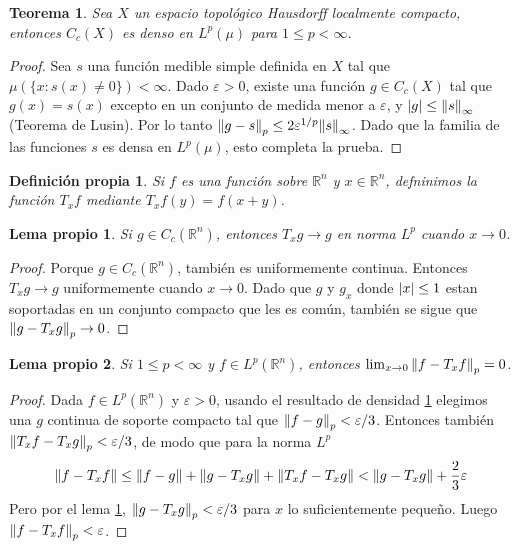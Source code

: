 \documentclass{article}
\newcommand{\realNumbers}{\mathbb{R}}
\newtheorem{theorem}{Teorema}
\newtheorem{myDefinition}{Definición propia}
\newtheorem{myLemma}{Lema propio}
\theoremstyle{remark}
\begin{document}
  \begin{theorem}
    \label{theorem:compactlySupportedFunctionsAreDenseInLp}
    Sea \(X\) un espacio topológico Hausdorff localmente compacto, entonces \(C_c(X)\) es denso en \(L^p(\mu)\) para \(1 \leq p < \infty\).
  \end{theorem}
  \begin{proof}
    Sea \(s\) una función medible simple definida en \(X\) tal que \(\mu(\{x : s(x) \neq 0\}) < \infty\).
    Dado \(\varepsilon > 0\), existe una función \(g \in C_c(X)\) tal que \(g(x) = s(x)\) excepto en un conjunto de medida menor a \(\varepsilon\), y \(\abs{g} \leq \norm{s}_{\infty}\) (Teorema de Lusin).
    Por lo tanto \(\norm{g - s}_p \leq 2 \varepsilon^{1 / p} \norm{s}_{\infty}\).
    Dado que la familia de las funciones \(s\) es densa en \(L^p(\mu)\), esto completa la prueba.
  \end{proof}

  \begin{myDefinition}
    Si \(f\) es una función sobre \(\realNumbers^n\) y \(x \in \realNumbers^n\), defninimos la función \(T_x f\) mediante \(T_x f (y) = f(x + y)\).
  \end{myDefinition}

  \begin{myLemma}
    \label{myLemma:LpContinuityOfTranslationsForCompactlySupportedFunctions}
    Si \(g \in C_c(\realNumbers^n)\), entonces \(T_x g \rightarrow g\) en norma \(L^p\) cuando \(x \rightarrow 0\).
  \end{myLemma}
  \begin{proof}
    Porque \(g \in C_c(\realNumbers^n)\), también es uniformemente continua.
    Entonces \(T_x g \rightarrow g\) uniformemente cuando \(x \rightarrow 0\).
    Dado que \(g\) y \(g_x\) donde \(\abs{x} \leq 1\) estan soportadas en un conjunto compacto que les es común, también se sigue que \(\norm{g - T_x g}_p \rightarrow 0\).
  \end{proof}

  \begin{myLemma}
    \label{myLemma:LpContinuityOfTranslationsForLpFunctions}
    Si \(1 \leq p < \infty\) y \(f \in L^p(\realNumbers^n)\), entonces \(\lim_{x \rightarrow 0} \norm{f - T_x f}_p = 0\).
  \end{myLemma}
  \begin{proof}
    Dada \(f \in L^p(\realNumbers^n)\) y \(\varepsilon > 0\), usando el resultado de densidad \ref{theorem:compactlySupportedFunctionsAreDenseInLp} elegimos una \(g\) continua de soporte compacto tal que \(\norm{f - g}_p < \varepsilon / 3\).
    Entonces también \(\norm{T_x f - T_x g}_p < \varepsilon / 3\), de modo que para la norma \(L^p\)
    \begin{align}
      \norm{f - T_x f}
      \leq
      \norm{f - g} + \norm{g - T_x g} + \norm{T_x f - T_x g}
      <
      \norm{g - T_x g} + \frac{2}{3} \varepsilon    \end{align}
    Pero por el lema \ref{myLemma:LpContinuityOfTranslationsForCompactlySupportedFunctions}, \(\norm{g - T_x g}_p < \varepsilon / 3\) para \(x\) lo suficientemente pequeño.
    Luego \(\norm{f - T_x f}_p < \varepsilon\).
  \end{proof}
\end{document}

